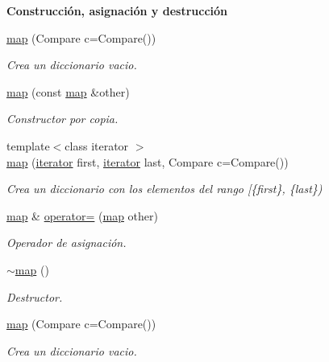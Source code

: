 \begin{Indent}{\bf \-Construcción, asignación y destrucción}\par
\begin{DoxyCompactItemize}
\item 
\hyperlink{classaed2_1_1map_a64da1d965b13eb28cdb3837bc17a18cf}{map} (\-Compare c=\-Compare())
\begin{DoxyCompactList}\small\item\em \-Crea un diccionario vacio. \end{DoxyCompactList}\item 
\hyperlink{classaed2_1_1map_a7a77950a3d8e637bfa7cf5dcd904f257}{map} (const \hyperlink{classaed2_1_1map}{map} \&other)
\begin{DoxyCompactList}\small\item\em \-Constructor por copia. \end{DoxyCompactList}\item 
{\footnotesize template$<$class iterator $>$ }\\\hyperlink{classaed2_1_1map_a5d336f3248572beb56be383dcc95cfeb}{map} (\hyperlink{classaed2_1_1map_1_1iterator}{iterator} first, \hyperlink{classaed2_1_1map_1_1iterator}{iterator} last, \-Compare c=\-Compare())
\begin{DoxyCompactList}\small\item\em \-Crea un diccionario con los elementos del rango \mbox{[}\{first\}, \{last\}) \end{DoxyCompactList}\item 
\hyperlink{classaed2_1_1map}{map} \& \hyperlink{classaed2_1_1map_ac606d334809066929522964d45e76317}{operator=} (\hyperlink{classaed2_1_1map}{map} other)
\begin{DoxyCompactList}\small\item\em \-Operador de asignación. \end{DoxyCompactList}\item 
\hyperlink{classaed2_1_1map_ab22c9a85c2dadbc286cd30e97069a8e6}{$\sim$map} ()
\begin{DoxyCompactList}\small\item\em \-Destructor. \end{DoxyCompactList}\item 
\hyperlink{classaed2_1_1map_a64da1d965b13eb28cdb3837bc17a18cf}{map} (\-Compare c=\-Compare())
\begin{DoxyCompactList}\small\item\em \-Crea un diccionario vacio. \end{DoxyCompactList}\item 

\end{DoxyCompactItemize}
\end{Indent}
